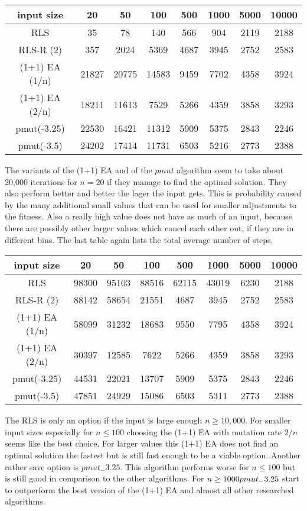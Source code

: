 \begin{tabular}{cccccccc}
      input size     & 20    & 50    & 100   & 500  & 1000 & 5000 & 10000 \\\hline
      RLS            & 35    & 78    & 140   & 566  & 904  & 2119 & 2188  \\
      RLS-R (2)      & 357   & 2024  & 5369  & 4687 & 3945 & 2752 & 2583  \\
      (1+1) EA (1/n) & 21827 & 20775 & 14583 & 9459 & 7702 & 4358 & 3924  \\
      (1+1) EA (2/n) & 18211 & 11613 & 7529  & 5266 & 4359 & 3858 & 3293  \\
      pmut(-3.25)    & 22530 & 16421 & 11312 & 5909 & 5375 & 2843 & 2246  \\
      pmut(-3.5)     & 24202 & 17414 & 11731 & 6503 & 5216 & 2773 & 2388  \\
\end{tabular}

The variants of the (1+1) EA and of the $pmut$ algorithm seem to take about 20,000 iterations for $n=20$ if they manage to find the optimal solution.
They also perform better and better the lager the input gets.
This is probability caused by the many additional small values that can be used for smaller adjustments to the fitness.
Also a really high value does not have as much of an input, because there are possibly other larger values which cancel each other out, if they are in different bins.
The last table again lists the total average number of steps.

\begin{tabular}{cccccccc}
      input size     & 20    & 50    & 100   & 500   & 1000  & 5000 & 10000 \\\hline
      RLS            & 98300 & 95103 & 88516 & 62115 & 43019 & 6230 & 2188  \\
      RLS-R (2)      & 88142 & 58654 & 21551 & 4687  & 3945  & 2752 & 2583  \\
      (1+1) EA (1/n) & 58099 & 31232 & 18683 & 9550  & 7795  & 4358 & 3924  \\
      (1+1) EA (2/n) & 30397 & 12585 & 7622  & 5266  & 4359  & 3858 & 3293  \\
      pmut(-3.25)    & 44531 & 22021 & 13707 & 5909  & 5375  & 2843 & 2246  \\
      pmut(-3.5)     & 47851 & 24929 & 15086 & 6503  & 5311  & 2773 & 2388  \\
\end{tabular}

The RLS is only an option if the input is large enough $n \ge 10,000$. For smaller input sizes especially for $n \le 100$ choosing the (1+1) EA with mutation rate $2/n$ seems like the best choice. For larger values this (1+1) EA does not find an optimal solution the fastest but is still fast enough to be a viable option. Another rather save option is $pmut_-3.25$. This algorithm performs worse for $n \le 100$ but is still good in comparison to the other algorithms. For $n \ge 1000 \space pmut_-3.25$ start to outperform the best version of the (1+1) EA and almost all other researched algorithms.